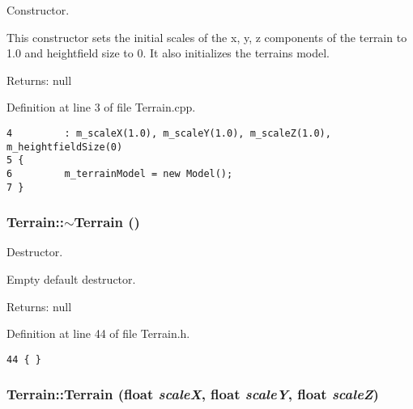 Constructor. 

This constructor sets the initial scales of the x, y, z components of the terrain to 1.0 and heightfield size to 0. It also initializes the terrains model.

\begin{Desc}
\item[Returns:]null \end{Desc}


Definition at line 3 of file Terrain.cpp.

\begin{Code}\begin{verbatim}4         : m_scaleX(1.0), m_scaleY(1.0), m_scaleZ(1.0), m_heightfieldSize(0)
5 {
6         m_terrainModel = new Model();
7 }
\end{verbatim}
\end{Code}


\hypertarget{class_terrain_2f7f0a2aee54886324ccf48a6f321de0}{
\subsubsection[$\sim$Terrain]{\setlength{\rightskip}{0pt plus 5cm}Terrain::$\sim$Terrain ()}}
\label{class_terrain_2f7f0a2aee54886324ccf48a6f321de0}


Destructor. 

Empty default destructor.

\begin{Desc}
\item[Returns:]null \end{Desc}


Definition at line 44 of file Terrain.h.

\begin{Code}\begin{verbatim}44 { }
\end{verbatim}
\end{Code}


\hypertarget{class_terrain_6ddefba9b991f9d08871bacad4734143}{
\subsubsection[Terrain]{\setlength{\rightskip}{0pt plus 5cm}Terrain::Terrain (float {\em scaleX}, \/  float {\em scaleY}, \/  float {\em scaleZ})}}
\label{class_terrain_6ddefba9b991f9d08871bacad4734143}


